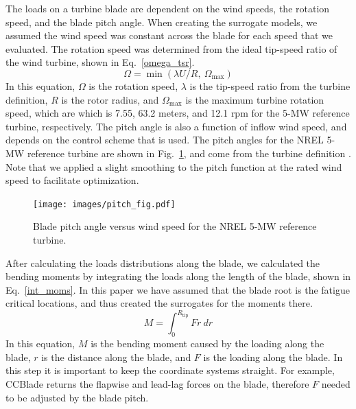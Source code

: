 \documentclass[11pt,letterpaper]{article}
\begin{document}
The loads on a turbine blade are dependent on the wind speeds, the rotation speed, and the blade pitch angle. When creating the surrogate models, we assumed the wind speed was constant across the blade for each speed that we evaluated. The rotation speed was determined from the ideal tip-speed ratio of the wind turbine, shown in Eq.~\ref{omega_tsr}. 
% 
\begin{equation}
    \Omega = \min{(\lambda U/R,~\Omega_\text{max})}
   \label{omega_tsr}
\end{equation}
% 
In this equation, $\Omega$ is the rotation speed, $\lambda$ is the tip-speed ratio from the turbine definition, $R$ is the rotor radius, and $\Omega_\text{max}$ is the maximum turbine rotation speed, which are which is 7.55, 63.2 meters, and 12.1 rpm for the 5-MW reference turbine, respectively.
The pitch angle is also a function of inflow wind speed, and depends on the control scheme that is used. The pitch angles for the NREL 5-MW reference turbine are shown in Fig.~\ref{pitch_fig}, and come from the turbine definition \cite{jonkman2009definition}. Note that we applied a slight smoothing to the pitch function at the rated wind speed to facilitate optimization.
% 
\begin{figure}
    \centering
    \texttt{[image: images/pitch\_fig.pdf]}
    \caption{Blade pitch angle versus wind speed for the NREL 5-MW reference turbine.}
    \label{pitch_fig}
\end{figure}

After calculating the loads distributions along the blade, we calculated the bending moments by integrating the loads along the length of the blade, shown in Eq.~\ref{int_moms}. In this paper we have assumed that the blade root is the fatigue critical locations, and thus created the surrogates for the moments there.
%
\begin{equation}
    \label{int_moms}
    M = \int_0^{R_{\text{tip}}} Fr~dr
\end{equation}
%
In this equation, $M$ is the bending moment caused by the loading along the blade, $r$ is the distance along the blade, and $F$ is the loading along the blade. In this step it is important to keep the coordinate systems straight. For example, CCBlade returns the flapwise and lead-lag forces on the blade, therefore $F$ needed to be adjusted by the blade pitch.
\end{document}
